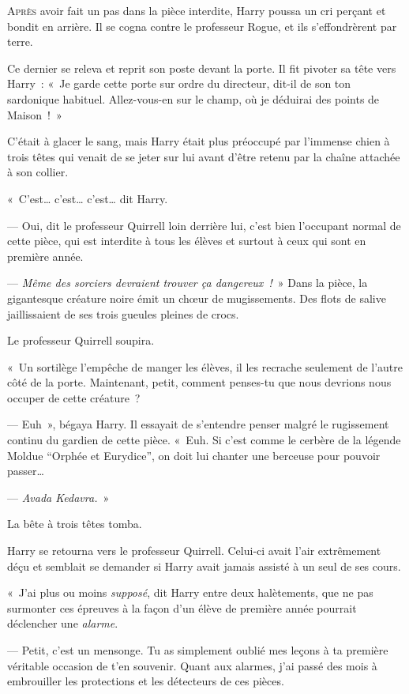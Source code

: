 
\lettrine{A}{près} avoir fait un pas dans la pièce interdite, Harry poussa un cri perçant et bondit en arrière.
Il se cogna contre le professeur Rogue, et ils s'effondrèrent par terre.

Ce dernier se releva et reprit son poste devant la porte.
Il fit pivoter sa tête vers Harry~: «~Je garde cette porte sur ordre du directeur, dit-il de son ton sardonique habituel.
Allez-vous-en sur le champ, où je déduirai des points de Maison~!~»

C'était à glacer le sang, mais Harry était plus préoccupé par l'immense chien à trois têtes qui venait de se jeter sur lui avant d'être retenu par la chaîne attachée à son collier.

«~C'est… c'est… c'est… dit Harry.

--- Oui, dit le professeur Quirrell loin derrière lui, c'est bien l'occupant normal de cette pièce, qui est interdite à tous les élèves et surtout à ceux qui sont en première année.

--- \emph{Même des sorciers devraient trouver ça dangereux~!}~» Dans la pièce, la gigantesque créature noire émit un chœur de mugissements.
Des flots de salive jaillissaient de ses trois gueules pleines de crocs.

Le professeur Quirrell soupira.

«~Un sortilège l'empêche de manger les élèves, il les recrache seulement de l'autre côté de la porte.
Maintenant, petit, comment penses-tu que nous devrions nous occuper de cette créature~?

--- Euh~», bégaya Harry.
Il essayait de s'entendre penser malgré le rugissement continu du gardien de cette pièce.
«~Euh. Si c'est comme le cerbère de la légende Moldue “Orphée et Eurydice”, on doit lui chanter une berceuse pour pouvoir passer…

--- \emph{Avada Kedavra.}~»

La bête à trois têtes tomba.

Harry se retourna vers le professeur Quirrell.
Celui-ci avait l'air extrêmement déçu et semblait se demander si Harry avait jamais assisté à un seul de ses cours.

«~J'ai plus ou moins \emph{supposé}, dit Harry entre deux halètements, que ne pas surmonter ces épreuves à la façon d'un élève de première année pourrait déclencher une \emph{alarme}.

--- Petit, c'est un mensonge.
Tu as simplement oublié mes leçons à ta première véritable occasion de t'en souvenir.
Quant aux alarmes, j'ai passé des mois à embrouiller les protections et les détecteurs de ces pièces.

